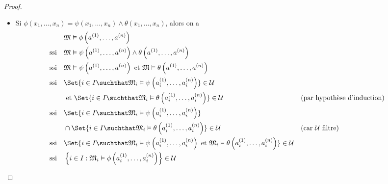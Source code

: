 \begin{proof}
\begin{itemize}
		\item Si $\phi\left(x_{1},\dots,x_{n}\right)=\psi\left(x_{1},\dots,x_{n}\right)\wedge\theta\left(x_{1},\dots,x_{n}\right)$, alors on a
		\begin{align*}
			&\quad\mathfrak{M}\vDash\phi\left(a^{\left(1\right)},\dots,a^{\left(n\right)}\right)\\
			\text{ssi}&\quad\mathfrak{M}\vDash\psi\left(a^{\left(1\right)},\dots,a^{\left(n\right)}\right)\wedge\theta\left(a^{\left(1\right)},\dots,a^{\left(n\right)}\right)\\
			\text{ssi}&\quad\mathfrak{M}\vDash\psi\left(a^{\left(1\right)},\dots,a^{\left(n\right)}\right)\text{ et }\mathfrak{M}\vDash\theta\left(a^{\left(1\right)},\dots,a^{\left(n\right)}\right)\\
			\text{ssi}&\quad\Set{i\in I\suchthat \mathfrak{M}_{i}\vDash\psi\left(a_{i}^{\left(1\right)},\dots,a_{i}^{\left(n\right)}\right)}\in\mathcal{U}\\
			&\quad\text{ et }\Set{i\in I\suchthat\mathfrak{M}_{i}\vDash\theta\left(a_{i}^{\left(1\right)},\dots,a_{i}^{\left(n\right)}\right)}\in\mathcal{U}&&\text{(par hypothèse d'induction)}\\
			\text{ssi}&\quad\Set{i\in I\suchthat\mathfrak{M}_{i}\vDash\psi\left(a_{i}^{\left(1\right)},\dots,a_{i}^{\left(n\right)}\right)}\\
			&\quad\cap\Set{i\in I\suchthat\mathfrak{M}_{i}\vDash\theta\left(a_{i}^{\left(1\right)},\dots,a_{i}^{\left(n\right)}\right)}\in\mathcal{U}&&\text{(car }\mathcal{U}\text{ filtre)}\\
			\text{ssi}&\quad\Set{i\in I\suchthat\mathfrak{M}_{i}\vDash\psi\left(a_{i}^{\left(1\right)},\dots,a_{i}^{\left(n\right)}\right)\text{ et }\mathfrak{M}_{i}\vDash\theta\left(a_{i}^{\left(1\right)},\dots,a_{i}^{\left(n\right)}\right)}\in\mathcal{U}\\
			\text{ssi}&\quad\left\{i\in I:\mathfrak{M}_{i}\vDash\phi\left(a_{i}^{\left(1\right)},\dots,a_{i}^{\left(n\right)}\right)\right\}\in\mathcal{U}
		\end{align*}
		

\end{itemize}
\end{proof}

